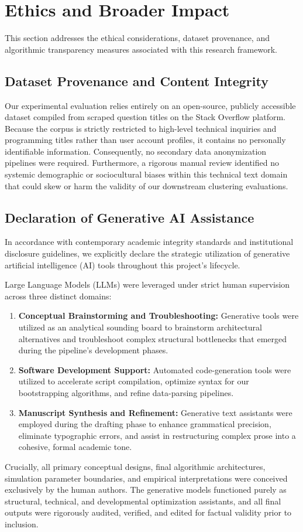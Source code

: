 \section{Ethics and Broader Impact}
\label{sec:ethics}

This section addresses the ethical considerations, dataset provenance, and algorithmic transparency measures associated with this research framework.

\subsection{Dataset Provenance and Content Integrity}
Our experimental evaluation relies entirely on an open-source, publicly accessible dataset compiled from scraped question titles on the Stack Overflow platform. 
Because the corpus is strictly restricted to high-level technical inquiries and programming titles rather than user account profiles, it contains no personally identifiable information. 
Consequently, no secondary data anonymization pipelines were required. 
Furthermore, a rigorous manual review identified no systemic demographic or sociocultural biases within this technical text domain that could skew or harm the validity of our downstream clustering evaluations.

\subsection{Declaration of Generative AI Assistance}
In accordance with contemporary academic integrity standards and institutional disclosure guidelines, we explicitly declare the strategic utilization of generative artificial intelligence (AI) tools throughout this project's lifecycle. 

Large Language Models (LLMs) were leveraged under strict human supervision across three distinct domains:
\begin{enumerate}
    \item \textbf{Conceptual Brainstorming and Troubleshooting:} 
    Generative tools were utilized as an analytical sounding board to brainstorm architectural alternatives and troubleshoot complex structural bottlenecks that emerged during the pipeline's development phases.
    \item \textbf{Software Development Support:} 
    Automated code-generation tools were utilized to accelerate script compilation, optimize syntax for our bootstrapping algorithms, and refine data-parsing pipelines. 
    \item \textbf{Manuscript Synthesis and Refinement:} 
    Generative text assistants were employed during the drafting phase to enhance grammatical precision, eliminate typographic errors, and assist in restructuring complex prose into a cohesive, formal academic tone.
\end{enumerate}
Crucially, all primary conceptual designs, final algorithmic architectures, simulation parameter boundaries, and empirical interpretations were conceived exclusively by the human authors. 
The generative models functioned purely as structural, technical, and developmental optimization assistants, and all final outputs were rigorously audited, verified, and edited for factual validity prior to inclusion.